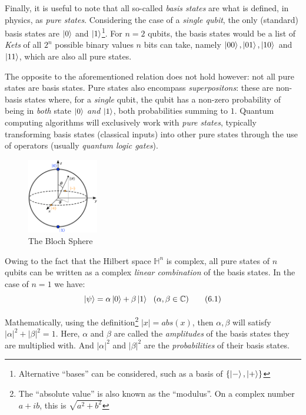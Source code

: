 \documentclass[conference]{IEEEtran}
\begin{document}
Finally, it is useful to note that all so-called \textit{basis states} are what is defined, in physics,
as \textit{pure states}.
Considering the case of a \textit{single qubit}, the only (standard) basis states are $\ket{0}$ and
$\ket{1}$\footnote{Alternative ``bases'' can be considered, such as a basis of $\{\ket{-},\ket{+}\}$}.
For $n=2$ qubits, the basis states would be a list of \textit{Kets} of all $2^n$ possible binary values $n$ bits can take,
namely $\ket{00}, \ket{01}, \ket{10}$ and $\ket{11}$, which are also all pure states.

The opposite to the aforementioned relation does not hold however: not all pure states are basis states.
Pure states also encompass \textit{superpositons}: these are non-basis states where, for a \textit{single} qubit,
the qubit has a non-zero probability of being in \textit{both} state $\ket{0}$ \textit{and} $\ket{1}$, both probabilities summing to $1$.
Quantum computing algorithms will exclusively work with \textit{pure states}, typically transforming basis
states (classical inputs) into other pure states through the use of operators (usually \textit{quantum logic gates}).

\begin{figure}[tbp]
    \centerline{
        \includegraphics[width=0.275\textwidth]{img/Bloch_sphere.png}
    }
    \caption{The Bloch Sphere\cite{ref:img:TheBlockSphere}}
    \label{fig:blochsphere}
\end{figure}

Owing to the fact that the Hilbert space $\mathbb{H}^n$ is complex,
all pure states of $n$ qubits can be written as a complex \textit{linear combination} of the basis states. In the case of $n=1$ we have:
\begin{equation}
    \ket{\psi} = \alpha\ket{0} + \beta\ket{1} \ \ (\alpha, \beta \in \mathbb{C}) \tag{6.1} \label{eq:purestate1}
\end{equation}

Mathematically, using the definition\footnote{The ``absolute value'' is also known as the ``modulus''. On a complex number $a + ib$, this is $\sqrt{a^2 + b^2}$}
$|x|=abs(x)$, then $\alpha, \beta$ will satisfy $|\alpha|^2 + |\beta|^2 = 1$.
Here, $\alpha$ and $\beta$ are called the \textit{amplitudes} of the basis states they are multiplied with.
And $|\alpha|^2$ and $|\beta|^2$ are the \textit{probabilities} of their basis states.
\end{document}
